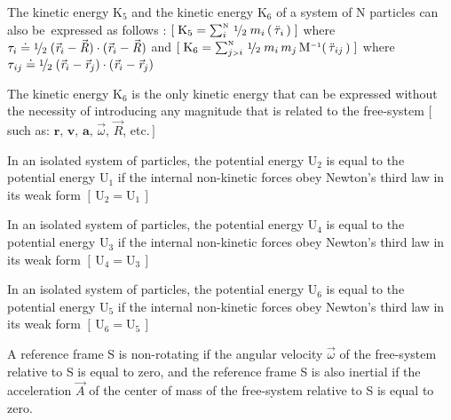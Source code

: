 \documentclass[10pt]{article}
\newcommand{\med}{\raise.5ex\hbox{$\scriptstyle 1$}\kern-.15em/\kern-.09em\lower.25ex\hbox{$\scriptstyle 2$}}
\begin{document}
\par \bigskip\smallskip \noindent The kinetic energy ${\mathrm{K}}_5$ and the kinetic energy ${\mathrm{K}}_6$ of a system of N particles can also \hbox {be expressed} as follows : $[ \; {\mathrm{K}}_5 = \sum_i^{\scriptscriptstyle{\mathrm{N}}} \, \med \; m_i \, ( \, {\ddot{\tau}}_{\hspace{+0.045em}i} \, ) \; ]$ where ${\tau}_{i} \doteq \med \; ({\vec{\mathit{r}}}_{i} - {\vec{\mathit{R}}}) \cdot ({\vec{\mathit{r}}}_{i} - {\vec{\mathit{R}}})$ and \hbox {$[ \; {\mathrm{K}}_6 = \sum_{j{\scriptscriptstyle >}i}^{\scriptscriptstyle{\mathrm{N}}} \, \med \; m_i \, m_j \, {\mathrm{M}}^{\scriptscriptstyle -1} ( \, {\ddot{\tau}}_{\hspace{+0.060em}ij} \, ) \; ]$} where ${\tau}_{\hspace{+0.060em}ij} \doteq \med \; ({\vec{\mathit{r}}}_{i} - {\vec{\mathit{r}}}_{j}) \cdot ({\vec{\mathit{r}}}_{i} - {\vec{\mathit{r}}}_{j})$

\par \bigskip\smallskip \noindent The kinetic energy ${\mathrm{K}}_6$ is the only kinetic energy that can be expressed without the necessity of introducing any magnitude that is related to the free-system $[ \, $such as: ${\mathbf{r}},\, {\mathbf{v}},\, {\mathbf{a}},\, {\vec{\omega}},\, {\vec{\mathit{R}}}$, etc.$ \, ]$

\par \bigskip\smallskip \noindent In an isolated system of particles, the potential energy ${\mathrm{U}}_2$ is equal to the potential energy ${\mathrm{U}}_1$ if the internal non-kinetic forces obey Newton's third law in its weak form $[ \, {\mathrm{U}}_2 = {\mathrm{U}}_1 \, ]$

\par \bigskip\smallskip \noindent In an isolated system of particles, the potential energy ${\mathrm{U}}_4$ is equal to the potential energy ${\mathrm{U}}_3$ if the internal non-kinetic forces obey Newton's third law in its weak form $[ \, {\mathrm{U}}_4 = {\mathrm{U}}_3 \, ]$

\par \bigskip\smallskip \noindent In an isolated system of particles, the potential energy ${\mathrm{U}}_6$ is equal to the potential energy ${\mathrm{U}}_5$ if the internal non-kinetic forces obey Newton's third law in its weak form $[ \, {\mathrm{U}}_6 = {\mathrm{U}}_5 \, ]$

\par \bigskip\smallskip \noindent A reference frame S is non-rotating if the angular velocity ${\vec{\omega}}$ of the free-system relative to S is equal to zero, and the reference frame S is also inertial if the acceleration ${\vec{\mathit{A}}}$ of the center of mass of the free-system relative to S is equal to zero.
\end{document}
